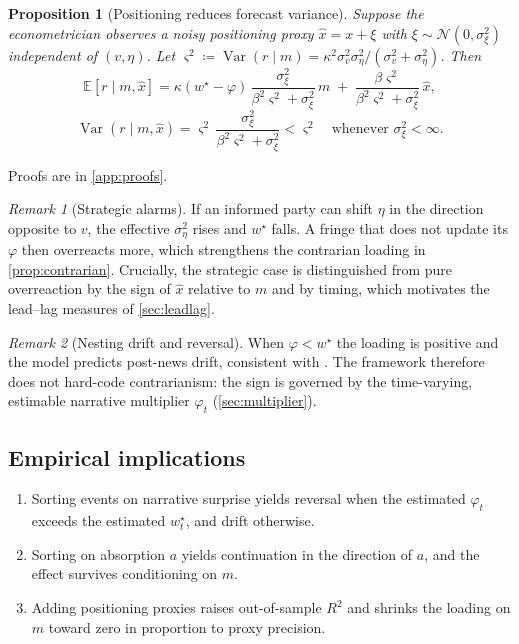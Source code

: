 \documentclass[11pt,a4paper]{article}
\theoremstyle{plain}
\newtheorem{proposition}{Proposition}
\theoremstyle{definition}
\theoremstyle{remark}
\newtheorem{remark}{Remark}
\newcommand{\E}{\mathbb{E}}
\newcommand{\N}{\mathcal{N}}
\DeclareMathOperator{\Var}{Var}
\begin{document}
\begin{proposition}[Positioning reduces forecast variance]\label{prop:positioning}
Suppose the econometrician observes a noisy positioning proxy $\hat x = x+\xi$ with $\xi\sim\N(0,\sigma_\xi^2)$ independent of $(v,\eta)$. Let $\varsigma^2\coloneqq\Var(r\mid m)=\kappa^2\sigma_v^2\sigma_\eta^2/(\sigma_v^2+\sigma_\eta^2)$. Then
\[
  \E[r\mid m,\hat x] = \kappa(w^\star-\varphi)\,\frac{\sigma_\xi^2}{\beta^2\varsigma^2+\sigma_\xi^2}\, m \;+\; \frac{\beta\varsigma^2}{\beta^2\varsigma^2+\sigma_\xi^2}\,\hat x,
\]
\[
  \Var(r\mid m,\hat x) = \varsigma^2\,\frac{\sigma_\xi^2}{\beta^2\varsigma^2+\sigma_\xi^2} < \varsigma^2 \quad\text{whenever } \sigma_\xi^2<\infty .
\]
\end{proposition}
Proofs are in \cref{app:proofs}.

\begin{remark}[Strategic alarms]
If an informed party can shift $\eta$ in the direction opposite to $v$, the effective $\sigma_\eta^2$ rises and $w^\star$ falls. A fringe that does not update its $\varphi$ then overreacts more, which strengthens the contrarian loading in \cref{prop:contrarian}. Crucially, the strategic case is distinguished from pure overreaction by the sign of $\hat x$ relative to $m$ and by timing, which motivates the lead--lag measures of \cref{sec:leadlag}.
\end{remark}

\begin{remark}[Nesting drift and reversal]
When $\varphi<w^\star$ the loading is positive and the model predicts post-news drift, consistent with \citet{chan2003}. The framework therefore does not hard-code contrarianism: the sign is governed by the time-varying, estimable narrative multiplier $\varphi_t$ (\cref{sec:multiplier}).
\end{remark}

\subsection{Empirical implications}\label{sec:implications}
\begin{enumerate}[label=\textbf{I\arabic*.}]
  \item Sorting events on narrative surprise yields reversal when the estimated $\varphi_t$ exceeds the estimated $w^\star_t$, and drift otherwise.
  \item Sorting on absorption $a$ yields continuation in the direction of $a$, and the effect survives conditioning on $m$.
  \item Adding positioning proxies raises out-of-sample $R^2$ and shrinks the loading on $m$ toward zero in proportion to proxy precision.
\end{enumerate}
\end{document}
